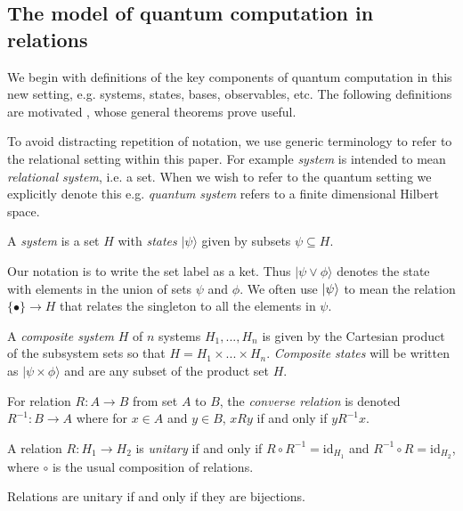 \subsection{The model of quantum computation in relations}

We begin with definitions of the key components of quantum computation in this new setting, e.g. systems, states, bases, observables, etc.  The following definitions are motivated , whose general theorems prove useful.

To avoid distracting repetition of notation, we use generic terminology to refer to the relational setting within this paper.  For example \emph{system} is intended to mean \emph{relational system}, i.e. a set.  When we wish to refer to the quantum setting we explicitly denote this e.g. \emph{quantum system} refers to a finite dimensional Hilbert space.

\begin{axiom}
A \emph{system} is a set $H$ with \emph{states} $|\psi\rangle$ given by subsets $\psi\subseteq H$.
\end{axiom}


\noindent Our notation is to write the set label as a ket. Thus $|\psi\vee\phi\rangle$ denotes the state with elements in the union of sets $\psi$ and $\phi$. We often use $| \psi \rangle$ to mean the relation $\{\bullet\}\to H$ that relates the singleton to all the elements in $\psi$.

\begin{axiom}
A \emph{composite system} $H$ of $n$ systems $H_1,...,H_n$ is given by the Cartesian product of the subsystem sets so that $H = H_1\times...\times H_n$. \emph{Composite states} will be written as $|\psi\times\phi\rangle$ and are any subset of the product set $H$.
\end{axiom}

\begin{defn}
For relation $R:A\to B$ from set $A$ to $B$, the \emph{converse relation} is denoted $R^{-1}:B\to A$ where for $x\in A$ and $y\in B$, $xRy$ if and only if $yR^{-1}x$.
\end{defn}

\begin{defn}
A relation $R:H_1\to H_2$ is \emph{unitary} if and only if $R\circ R^{-1} = \mbox{id}_{H_1}$ and $R^{-1}\circ R = \mbox{id}_{H_2}$, where $\circ$ is the usual composition of relations.
\end{defn}

\begin{corollary}
\label{cor:bijections}
Relations are unitary if and only if they are bijections.
\end{corollary}

